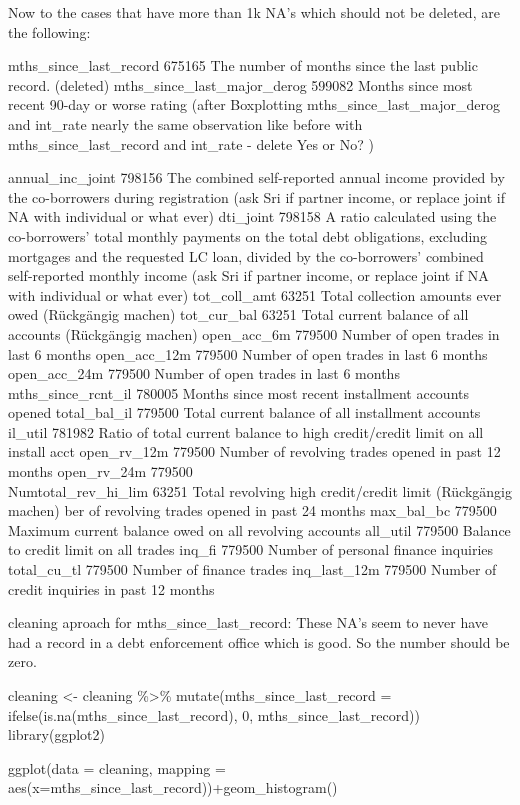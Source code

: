 \documentclass[
]{article}
\newenvironment{Shaded}{\begin{snugshade}}{\end{snugshade}}
\newcommand{\AttributeTok}[1]{\textcolor[rgb]{0.77,0.63,0.00}{#1}}
\newcommand{\DecValTok}[1]{\textcolor[rgb]{0.00,0.00,0.81}{#1}}
\newcommand{\FunctionTok}[1]{\textcolor[rgb]{0.00,0.00,0.00}{#1}}
\newcommand{\NormalTok}[1]{#1}
\newcommand{\OtherTok}[1]{\textcolor[rgb]{0.56,0.35,0.01}{#1}}
\newcommand{\SpecialCharTok}[1]{\textcolor[rgb]{0.00,0.00,0.00}{#1}}
\begin{document}
Now to the cases that have more than 1k NA's which should not be
deleted, are the following:

mths\_since\_last\_record 675165 The number of months since the last
public record. (deleted) mths\_since\_last\_major\_derog 599082 Months
since most recent 90-day or worse rating (after Boxplotting
mths\_since\_last\_major\_derog and int\_rate nearly the same
observation like before with mths\_since\_last\_record and int\_rate -
delete Yes or No? )

annual\_inc\_joint 798156 The combined self-reported annual income
provided by the co-borrowers during registration (ask Sri if partner
income, or replace joint if NA with individual or what ever) dti\_joint
798158 A ratio calculated using the co-borrowers' total monthly payments
on the total debt obligations, excluding mortgages and the requested LC
loan, divided by the co-borrowers' combined self-reported monthly income
(ask Sri if partner income, or replace joint if NA with individual or
what ever) tot\_coll\_amt 63251 Total collection amounts ever owed
(Rückgängig machen) tot\_cur\_bal 63251 Total current balance of all
accounts (Rückgängig machen) open\_acc\_6m 779500 Number of open trades
in last 6 months open\_acc\_12m 779500 Number of open trades in last 6
months open\_acc\_24m 779500 Number of open trades in last 6 months
mths\_since\_rcnt\_il 780005 Months since most recent installment
accounts opened total\_bal\_il 779500 Total current balance of all
installment accounts il\_util 781982 Ratio of total current balance to
high credit/credit limit on all install acct open\_rv\_12m 779500 Number
of revolving trades opened in past 12 months open\_rv\_24m 779500\\
Numtotal\_rev\_hi\_lim 63251 Total revolving high credit/credit limit
(Rückgängig machen) ber of revolving trades opened in past 24 months
max\_bal\_bc 779500 Maximum current balance owed on all revolving
accounts all\_util 779500 Balance to credit limit on all trades inq\_fi
779500 Number of personal finance inquiries total\_cu\_tl 779500 Number
of finance trades inq\_last\_12m 779500 Number of credit inquiries in
past 12 months

cleaning aproach for mths\_since\_last\_record: These NA's seem to never
have had a record in a debt enforcement office which is good. So the
number should be zero.

\begin{Shaded}
\begin{Highlighting}[]
\NormalTok{cleaning }\OtherTok{\textless{}{-}}\NormalTok{ cleaning }\SpecialCharTok{\%\textgreater{}\%} \FunctionTok{mutate}\NormalTok{(}\AttributeTok{mths\_since\_last\_record =} \FunctionTok{ifelse}\NormalTok{(}\FunctionTok{is.na}\NormalTok{(mths\_since\_last\_record), }\DecValTok{0}\NormalTok{, mths\_since\_last\_record))}
\FunctionTok{library}\NormalTok{(ggplot2)}

\FunctionTok{ggplot}\NormalTok{(}\AttributeTok{data =}\NormalTok{ cleaning, }\AttributeTok{mapping =} \FunctionTok{aes}\NormalTok{(}\AttributeTok{x=}\NormalTok{mths\_since\_last\_record))}\SpecialCharTok{+}\FunctionTok{geom\_histogram}\NormalTok{()}
\end{Highlighting}
\end{Shaded}
\end{document}
